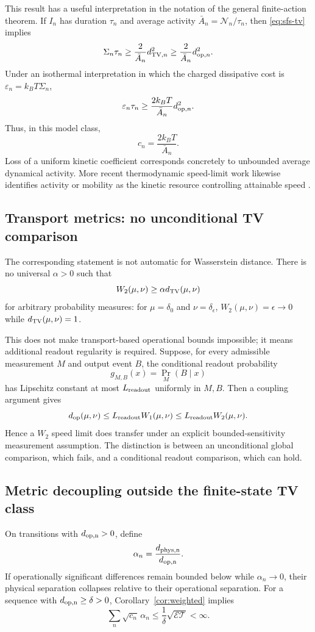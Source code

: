 \documentclass[11pt,a4paper]{article}
\theoremstyle{definition}
\numberwithin{equation}{section}
\begin{document}
This result has a useful interpretation in the notation of the general
finite-action theorem. If $I_n$ has duration $\tau_n$ and average activity
$\bar A_n=\mathcal N_n/\tau_n$, then \eqref{eq:sfs-tv} implies
\[
\Sigma_n\tau_n
\ge
\frac{2}{\bar A_n}d_{{\rm TV},n}^2
\ge
\frac{2}{\bar A_n}d_{{\rm op},n}^2.
\]
Under an isothermal interpretation in which the charged dissipative cost is
$\varepsilon_n=k_BT\Sigma_n$,
\begin{equation}
\varepsilon_n\tau_n
\ge
\frac{2k_BT}{\bar A_n}d_{{\rm op},n}^2.
\label{eq:activity-coefficient}
\end{equation}
Thus, in this model class,
\[
c_n=\frac{2k_BT}{\bar A_n}.
\]
Loss of a uniform kinetic coefficient corresponds concretely to unbounded
average dynamical activity. More recent thermodynamic speed-limit work likewise
identifies activity or mobility as the kinetic resource controlling attainable
speed \cite{VuSaito2023,Nagayama2025}.

\subsection*{Transport metrics: no unconditional TV comparison}

The corresponding statement is not automatic for Wasserstein distance. There
is no universal $\alpha>0$ such that
\[
W_2(\mu,\nu)\ge\alpha d_{\rm TV}(\mu,\nu)
\]
for arbitrary probability measures: for
$\mu=\delta_0$ and $\nu=\delta_\epsilon$,
$W_2(\mu,\nu)=\epsilon\to0$ while
$d_{\rm TV}(\mu,\nu)=1$.

This does not make transport-based operational bounds impossible; it means
additional readout regularity is required. Suppose, for every admissible
measurement $M$ and output event $B$, the conditional readout probability
\[
g_{M,B}(x)=\Pr_M(B\mid x)
\]
has Lipschitz constant at most $L_{\rm readout}$ uniformly in $M,B$. Then a
coupling argument gives
\[
d_{\rm op}(\mu,\nu)
\le L_{\rm readout}W_1(\mu,\nu)
\le L_{\rm readout}W_2(\mu,\nu).
\]
Hence a $W_2$ speed limit does transfer under an explicit bounded-sensitivity
measurement assumption. The distinction is between an unconditional global
comparison, which fails, and a conditional readout comparison, which can hold.

\subsection*{Metric decoupling outside the finite-state TV class}

On transitions with $d_{\rm op,n}>0$, define
\[
\alpha_n=
\frac{d_{\rm phys,n}}{d_{\rm op,n}}.
\]
If operationally significant differences remain bounded below while
$\alpha_n\to0$, their physical separation collapses relative to their
operational separation. For a sequence with
$d_{\rm op,n}\ge\delta>0$, Corollary~\ref{cor:weighted} implies
\begin{equation}
\boxed{
\sum_n\sqrt{c_n}\,\alpha_n
\le
\frac1\delta\sqrt{\mathcal E\mathcal T}<\infty.
}
\label{eq:operational-weighted}
\end{equation}
\end{document}
